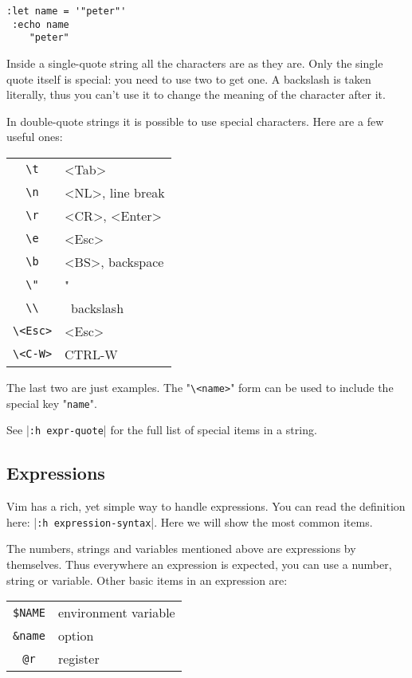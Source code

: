 \begin{Verbatim}[samepage=true]
 :let name = '"peter"'
 :echo name
    "peter"
\end{Verbatim}

Inside a single-quote string all the characters are as they are.
Only the single quote itself is special: you need to use two to get one.
A backslash is taken literally, thus you can't use it to change the meaning of the character after it.

In double-quote strings it is possible to use special characters.
Here are a few useful ones:

\begin{center} \begin{tabular}{c l}
				\verb!\t! & <Tab> \\
				\verb!\n! & <NL>, line break \\
				\verb!\r! & <CR>, <Enter> \\
				\verb!\e! & <Esc> \\
				\verb!\b! & <BS>, backspace \\
				\verb!\"! & " \\
				\verb!\\! & \, backslash \\
				\verb!\<Esc>! & <Esc> \\
				\verb!\<C-W>! & CTRL-W \\
\end{tabular} \end{center}

The last two are just examples.
The  "\verb!\<name>!" form can be used to include the special key "\verb!name!".

See |\verb!:h expr-quote!| for the full list of special items in a string.
\subsection{Expressions}
Vim has a rich, yet simple way to handle expressions.
You can read the definition here: |\verb!:h expression-syntax!|.
Here we will show the most common items.

The numbers, strings and variables mentioned above are expressions by themselves.
Thus everywhere an expression is expected, you can use a number, string or variable.
Other basic items in an expression are:

\begin{center} \begin{tabular}{c l}
				\verb!$NAME! & environment variable \\
				\verb!&name! & option \\
				\verb!@r! & register \\
\end{tabular} \end{center}


